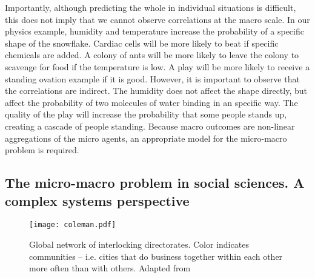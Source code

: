 Importantly, although predicting the whole in individual situations is difficult, 
this does not imply that we cannot observe correlations at the macro scale. 
In our physics example, humidity and temperature increase the probability of a specific shape of the snowflake. 
Cardiac cells will be more likely to beat if specific chemicals are added.
A colony of ants will be more likely to leave the colony to scavenge for food if the temperature is low. 
A play will be more likely to receive a standing ovation example if it is good.
However, it is important to observe that the correlations are indirect.
The humidity does not affect the shape directly, but affect the probability of two molecules of water binding in an specific way. 
The quality of the play will increase the probability that some people stands up, 
creating a cascade of people standing. 
Because macro outcomes are non-linear aggregations of the micro agents, 
an appropriate model for the micro-macro problem is required.


\subsection{The micro-macro problem in social sciences. A complex systems perspective}
\label{sec:complexSocialSystems}
\begin{figure}[h!]
\begin{center}
\texttt{[image: coleman.pdf]}
\end{center}
\caption{Global network of interlocking directorates. Color indicates communities -- i.e. cities that do business together within each other more often than with others. Adapted from \cite{raub2011micro}}
\label{fig:coleman_scheme}
\end{figure}

